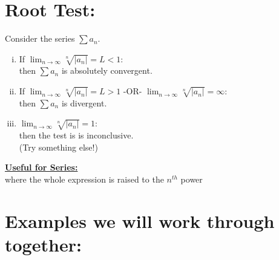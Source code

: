 \section*{Root Test:}
Consider the series \(\sum a_n\). 
 \begin{enumerate}[(i)] 
 \item If \(\lim_{n\rightarrow \infty} \sqrt[n]{|a_n|}= L < 1\):\\
  then \(\sum a_n\) is absolutely convergent. %
  \item If \(\lim_{n\rightarrow \infty} \sqrt[n]{|a_n|} = L > 1\)
  -OR- 
  \(\lim_{n\rightarrow \infty} \sqrt[n]{|a_n|}=\infty\):\\
   then \(\sum a_n\) is divergent.  %
\item \(\lim_{n\rightarrow \infty} \sqrt[n]{|a_n|} = 1\):\\
 then the test is is inconclusive.\\
  (Try something else!)
 \end{enumerate} 
  \underline{\textbf{Useful for Series:}}\\
 where the whole expression is raised to the  \(n^{th}\) power




\section*{Examples we will work through together:}

